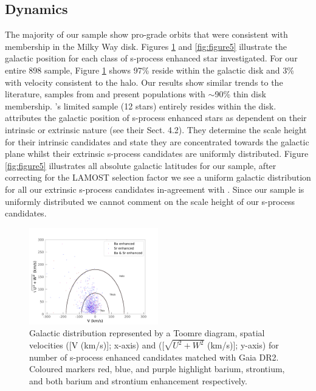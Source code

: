 \documentclass[a4paper,fleqn,usenatbib]{mnras}
\begin{document}
\subsection{Dynamics}

The majority of our sample show pro-grade orbits that were consistent with membership in the Milky Way disk. Figures \ref{fig:figure4} and \ref{fig:figure5} illustrate the galactic position for each class of s-process enhanced star investigated. For our entire 898 sample, Figure \ref{fig:figure4} shows 97\% reside within the galactic disk and 3\% with velocity consistent to the halo. Our results show similar trends to the literature, samples from \cite{gomez1997} and  
\cite{decastro2016} present populations with $\sim$90\% thin disk membership. \cite{pereira2011}'s limited sample (12 stars) entirely resides within the disk. \cite{jorissen1993} attributes the galactic position of s-process enhanced stars as dependent on their intrinsic or extrinsic nature (see their Sect. 4.2). They determine the scale height for their intrinsic candidates and state they are concentrated towards the galactic plane whilst their extrinsic s-process candidates are uniformly distributed. Figure \ref{fig:figure5} illustrates all absolute galactic latitudes for our sample, after correcting for the LAMOST selection factor we see a uniform galactic distribution for all our extrinsic s-process candidates in-agreement with \citet{jorissen1993}. Since our sample is uniformly distributed we cannot comment on the scale height of our s-process candidates.

\begin{figure}
	\includegraphics[width=0.5\textwidth]{toomre.pdf}
	\caption{Galactic distribution represented by a Toomre diagram, spatial velocities ([V (km/s)]; x-axis) and ([$\sqrt{U^2+W^2}$ (km/s)]; y-axis) for number of s-process enhanced candidates matched with Gaia DR2. Coloured markers red, blue, and purple highlight barium, strontium, and both barium and strontium enhancement respectively.}
	\label{fig:figure4}
\end{figure}
\end{document}
